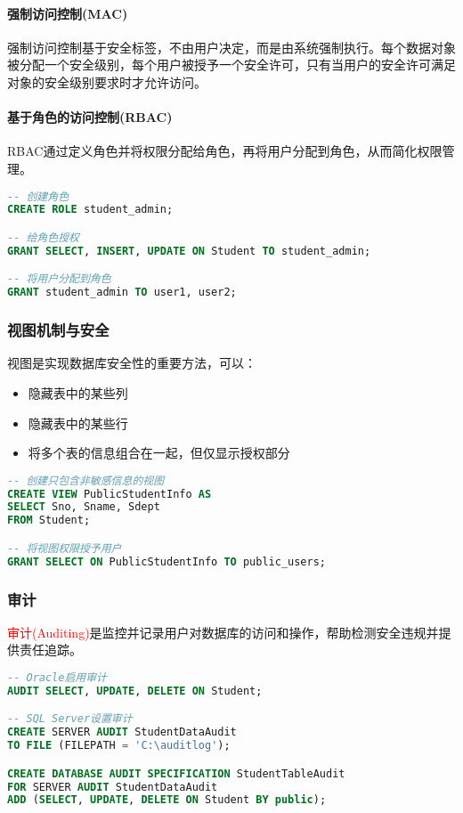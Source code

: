 \documentclass{../../note}
\begin{document}
\paragraph{强制访问控制(MAC)}
强制访问控制基于安全标签，不由用户决定，而是由系统强制执行。每个数据对象被分配一个安全级别，每个用户被授予一个安全许可，只有当用户的安全许可满足对象的安全级别要求时才允许访问。

\paragraph{基于角色的访问控制(RBAC)}
RBAC通过定义角色并将权限分配给角色，再将用户分配到角色，从而简化权限管理。

\begin{lstlisting}[language=SQL, caption=使用角色进行权限管理]
-- 创建角色
CREATE ROLE student_admin;

-- 给角色授权
GRANT SELECT, INSERT, UPDATE ON Student TO student_admin;

-- 将用户分配到角色
GRANT student_admin TO user1, user2;
\end{lstlisting}

\subsubsection{视图机制与安全}
视图是实现数据库安全性的重要方法，可以：
\begin{itemize}
    \item 隐藏表中的某些列
    \item 隐藏表中的某些行
    \item 将多个表的信息组合在一起，但仅显示授权部分
\end{itemize}

\begin{lstlisting}[language=SQL, caption=使用视图限制数据访问]
-- 创建只包含非敏感信息的视图
CREATE VIEW PublicStudentInfo AS
SELECT Sno, Sname, Sdept
FROM Student;

-- 将视图权限授予用户
GRANT SELECT ON PublicStudentInfo TO public_users;
\end{lstlisting}

\subsubsection{审计}
\textcolor{red}{审计(Auditing)}是监控并记录用户对数据库的访问和操作，帮助检测安全违规并提供责任追踪。

\begin{lstlisting}[language=SQL, caption=启用数据库审计]
-- Oracle启用审计
AUDIT SELECT, UPDATE, DELETE ON Student;

-- SQL Server设置审计
CREATE SERVER AUDIT StudentDataAudit
TO FILE (FILEPATH = 'C:\auditlog');

CREATE DATABASE AUDIT SPECIFICATION StudentTableAudit
FOR SERVER AUDIT StudentDataAudit
ADD (SELECT, UPDATE, DELETE ON Student BY public);
\end{lstlisting}
\end{document}
